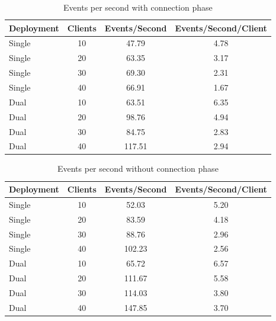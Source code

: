 \documentclass[a4paper,10pt]{article}
\begin{document}
\begin{table}
\centering
\begin{tabular}{| l | c | c | c |}
\hline
\textbf{Deployment} & \textbf{Clients} & \textbf{Events/Second}  & \textbf{Events/Second/Client} \\
\hline
\hline
Single & 10 & 47.79& 4.78\\
\hline
Single & 20 &63.35 &3.17 \\
\hline
Single & 30& 69.30& 2.31\\
\hline
Single & 40& 66.91& 1.67\\
\hline
\hline
Dual & 10 & 63.51& 6.35\\
\hline
Dual & 20 & 98.76&4.94 \\
\hline
Dual & 30 & 84.75&2.83 \\
\hline
Dual & 40 &117.51 & 2.94\\
\hline
\end{tabular}
\caption{Events per second with connection phase}
\label{tab:expeventswith}
\end{table}

\begin{table}
\centering
\begin{tabular}{| l | c | c | c |}
\hline
\textbf{Deployment} & \textbf{Clients} & \textbf{Events/Second}  & \textbf{Events/Second/Client} \\
\hline
\hline
Single & 10 & 52.03& 5.20\\
\hline
Single & 20 & 83.59& 4.18\\
\hline
Single & 30&88.76 & 2.96\\
\hline
Single & 40&102.23 & 2.56\\
\hline
\hline
Dual & 10 & 65.72&6.57 \\
\hline
Dual & 20 &111.67 &5.58 \\
\hline
Dual & 30 &  114.03&3.80 \\
\hline
Dual & 40 &147.85 &3.70 \\
\hline
\end{tabular}
\caption{Events per second without connection phase}
\label{tab:expeventswithout}
\end{table}
\end{document}
